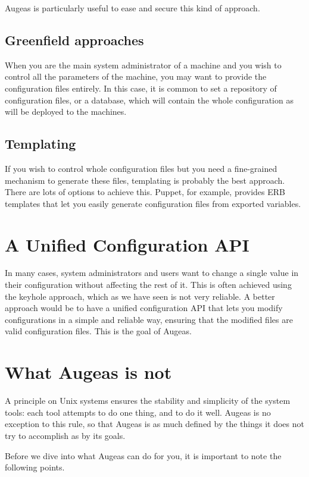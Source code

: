 Augeas is particularly useful to ease and secure this kind of approach.

\subsection*{Greenfield approaches}

When you are the main system administrator of a machine and you wish to control all the parameters of the machine, you may want to provide the configuration files entirely. In this case, it is common to set a repository of configuration files, or a database, which will contain the whole configuration as will be deployed to the machines.

\subsection*{Templating}

If you wish to control whole configuration files but you need a fine-grained mechanism to generate these files, templating is probably the best approach. There are lots of options to achieve this. Puppet, for example, provides ERB templates that let you easily generate configuration files from exported variables.

\section*{A Unified Configuration API}

In many cases, system administrators and users want to change a single value in their configuration without affecting the rest of it. This is often achieved using the keyhole approach, which as we have seen is not very reliable. A better approach would be to have a unified configuration API that lets you modify configurations in a simple and reliable way, ensuring that the modified files are valid configuration files. This is the goal of Augeas.

\section*{What Augeas is not}

A principle on Unix systems ensures the stability and simplicity of the system tools: each tool attempts to do one thing, and to do it well. Augeas is no exception to this rule, so that Augeas is as much defined by the things it does not try to accomplish as by its goals.

Before we dive into what Augeas can do for you, it is important to note the following points.

